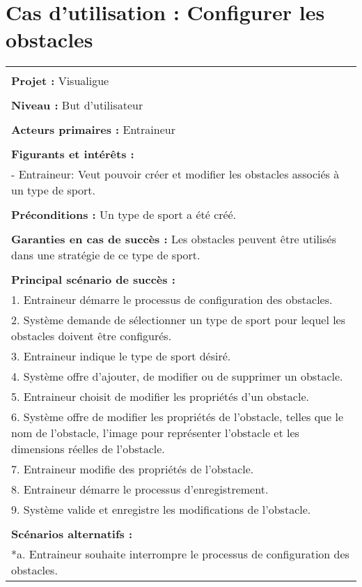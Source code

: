 \section{Cas d'utilisation : Configurer les obstacles}
\begin{longtable}{|p{16cm}|}
	\hline
	\\
	\textbf{Projet :} Visualigue\\
	\\
	\textbf{Niveau :} But d'utilisateur\\
	\\
	\textbf{Acteurs primaires :} Entraineur\\
	\\
	\textbf{Figurants et intérêts :} \\
	- Entraineur: Veut pouvoir créer et modifier les obstacles associés à un type de sport.\\
	\\
	\textbf{Préconditions :} Un type de sport a été créé.\\
	\\
	\textbf{Garanties en cas de succès :} Les obstacles peuvent être utilisés dans une stratégie de ce type de sport.\\
	\\
	\textbf{Principal scénario de succès :}\\
	1. Entraineur démarre le processus de configuration des obstacles.\\
	2. Système demande de sélectionner un type de sport pour lequel les obstacles doivent être configurés.\\
	3. Entraineur indique le type de sport désiré.\\
	4. Système offre d'ajouter, de modifier ou de supprimer un obstacle.\\
	5. Entraineur choisit de modifier les propriétés d'un obstacle.\\
	6. Système offre de modifier les propriétés de l'obstacle, telles que le nom de l'obstacle, l'image pour représenter l'obstacle et les dimensions réelles de l'obstacle.\\
	7. Entraineur modifie des propriétés de l'obstacle.\\
	8. Entraineur démarre le processus d'enregistrement.\\
	9. Système valide et enregistre les modifications de l'obstacle.\\
	\\
	\textbf{Scénarios alternatifs :}\\
	*a. Entraineur souhaite interrompre le processus de configuration des obstacles.\\

\end{longtable}
